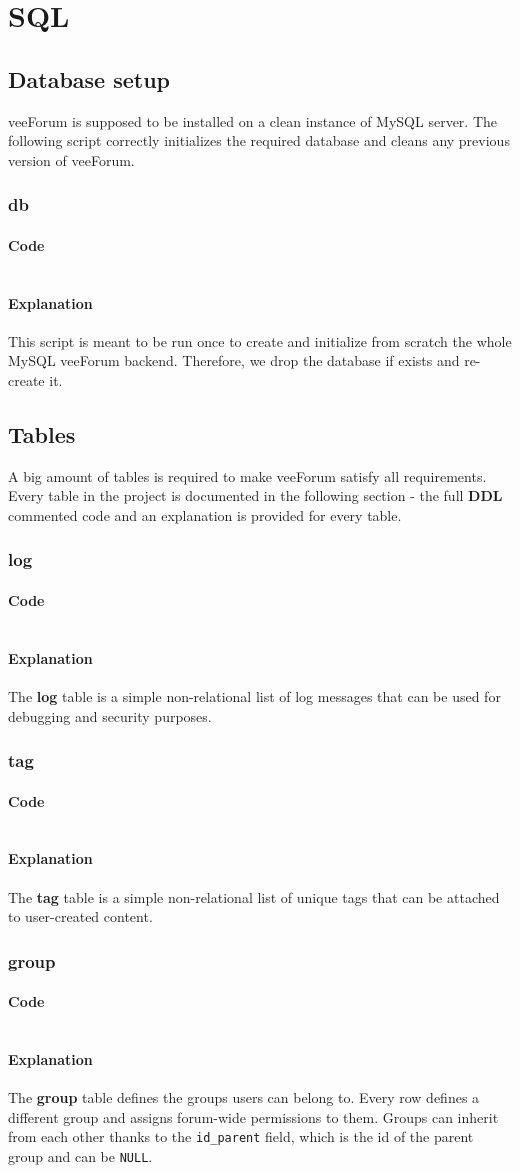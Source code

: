 \documentclass[12pt]{report}
\renewcommand\emph{\textbf}
\newcommand{\printSQLtest}[1]
{
    \inputminted[linenos, breaklines, breakbytoken, tabsize=4, fontsize=\footnotesize]{mysql}{#1}
}
\newcommand{\printSQLTablepage}[2]
{    
    \subsection{#2}
    \subsubsection{Code}
    \printSQLtest{../sql/parts/#1}
    \subsubsection{Explanation}
}
\begin{document}
                \newpage

        \chapter{SQL}

            \section{Database setup}

                veeForum is supposed to be installed on a clean instance of MySQL server. The following script correctly initializes the required database and cleans any previous version of veeForum.

                \printSQLTablepage{00_db.sql}{db}
                    This script is meant to be run once to create and initialize from scratch the whole MySQL veeForum backend.
                    Therefore, we drop the database if exists and re-create it.

                \newpage

            \section{Tables}

                A big amount of tables is required to make veeForum satisfy all requirements. Every table in the project is documented in the following section - the full \emph{DDL} commented code and an explanation is provided for every table.

                \printSQLTablepage{01_tblLog.sql}{log}
                    The \emph{log} table is a simple non-relational list of log messages that can be used for debugging and security purposes.

                \newpage

                \printSQLTablepage{02_tblTag.sql}{tag}
                    The \emph{tag} table is a simple non-relational list of unique tags that can be attached to user-created content.

                \newpage

                \printSQLTablepage{03_tblGroup.sql}{group}
                    The \emph{group} table defines the groups users can belong to. Every row defines a different group and assigns forum-wide permissions to them.
                    Groups can inherit from each other thanks to the \texttt{id_parent} field, which is the id of the parent group and can be \texttt{NULL}.
\end{document}
